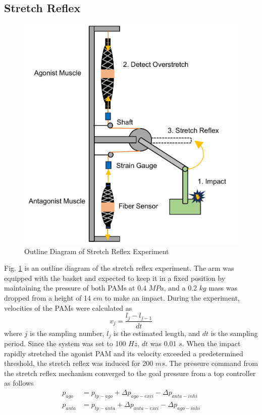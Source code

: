\subsection{Stretch Reflex}
\begin{figure}[t]
    \centering
    \includegraphics[width=0.7\columnwidth]{fig/reflex_experiment.pdf}
    \caption{Outline Diagram of Stretch Reflex Experiment}
    \label{fig:reflex_equipment}
 \end{figure}
Fig. \ref{fig:reflex_equipment} is an outline diagram of the stretch reflex experiment.
The arm was equipped with the basket and expected to keep it in a fixed position by maintaining the pressure of both PAMs at 0.4 $\si{MPa}$, and a 0.2 $\si{kg}$ mass was dropped from a height of 14 $\si{cm}$ to make an impact. During the experiment, velocities of the PAMs were calculated as
\begin{equation}
    \label{eq:velocity}
    v_j = \frac{l_j -l_{j-1}}{dt}
\end{equation}
where $j$ is the sampling number, $l_j$ is the estimated length, and $dt$ is the sampling period.
Since the system was set to 100 $\si{Hz}$, $dt$ was 0.01 $\si{s}$.
When the impact rapidly stretched the agonist PAM and its velocity exceeded a predetermined threshold, the stretch reflex was induced for 200 $\si{ms}$. The pressure command from the stretch reflex mechanism converged to the goal pressure from a top controller as follows
\begin{align}
    \label{eq:command_pressure}
    p_{ago} &= p_{tp - ago} + \Delta p_{ago - exci} - \Delta p_{anta - inhi} \\
    p_{anta} &= p_{tp - anta} + \Delta p_{anta - exci} - \Delta p_{ago - inhi}
\end{align}
